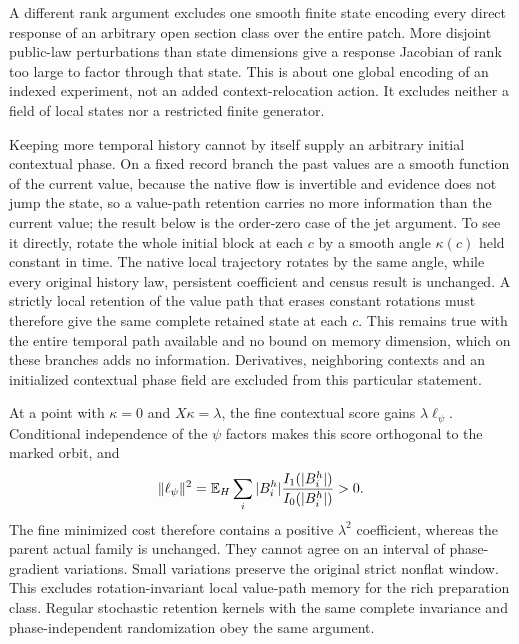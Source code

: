 A different rank argument excludes one smooth finite state encoding every direct response of an arbitrary open section class over the entire patch. More disjoint public-law perturbations than state dimensions give a response Jacobian of rank too large to factor through that state. This is about one global encoding of an indexed experiment, not an added context-relocation action. It excludes neither a field of local states nor a restricted finite generator.

Keeping more temporal history cannot by itself supply an arbitrary initial contextual phase. On a fixed record branch the past values are a smooth function of the current value, because the native flow is invertible and evidence does not jump the state, so a value-path retention carries no more information than the current value; the result below is the order-zero case of the jet argument. To see it directly, rotate the whole initial block at each $c$ by a smooth angle $\kappa(c)$ held constant in time. The native local trajectory rotates by the same angle, while every original history law, persistent coefficient and census result is unchanged. A strictly local retention of the value path that erases constant rotations must therefore give the same complete retained state at each $c$. This remains true with the entire temporal path available and no bound on memory dimension, which on these branches adds no information. Derivatives, neighboring contexts and an initialized contextual phase field are excluded from this particular statement.

At a point with $\kappa=0$ and $X\kappa=\lambda$, the fine contextual score gains $\lambda\ell_\psi$. Conditional independence of the $\psi$ factors makes this score orthogonal to the marked orbit, and
\begin{equation}
 \|\ell_\psi\|^2
 =\mathbb E_H\sum_i|B_i^h|\frac{I_1(|B_i^h|)}{I_0(|B_i^h|)}>0.
 \label{clp:causal-positive-score}
\end{equation}
The fine minimized cost therefore contains a positive $\lambda^2$ coefficient, whereas the parent actual family is unchanged. They cannot agree on an interval of phase-gradient variations. Small variations preserve the original strict nonflat window. This excludes rotation-invariant local value-path memory for the rich preparation class. Regular stochastic retention kernels with the same complete invariance and phase-independent randomization obey the same argument.

